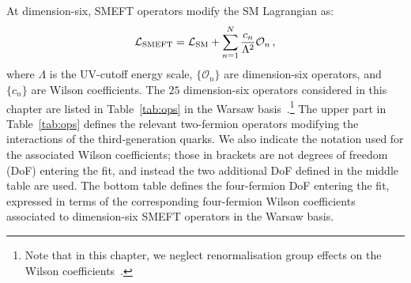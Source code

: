 \documentclass[withindex,glossary]{cam-thesis}
\begin{document}
At dimension-six, SMEFT operators modify the SM Lagrangian as:
\begin{equation}
    \label{eq:lagrangian}
    \mathcal{L}_{\rm SMEFT} = \mathcal{L}_{\rm SM} + \sum_{n=1}^{N} \frac{c_n}{\Lambda^2} \mathcal{O}_n \, ,
\end{equation}
%
where $\Lambda$ is the UV-cutoff energy scale, $\{\mathcal{O}_{n} \}$ are dimension-six operators, and
$\{ c_n \}$ are Wilson coefficients. The $25$ dimension-six operators considered in this chapter 
are listed in Table~\ref{tab:ops} in the Warsaw basis~\cite{Grzadkowski:2010es}.\footnote{Note that in this chapter, we neglect renormalisation group effects on the Wilson coefficients~\cite{Aoude:2022aro}. } 
The upper part in Table~\ref{tab:ops} defines the relevant two-fermion 
operators modifying the interactions of the third-generation
quarks.
%
We also indicate the notation used for the associated Wilson coefficients; those
in brackets are not degrees of freedom (DoF) entering the fit,
and instead the two additional DoF defined in the middle table are used.
%
The bottom table defines the four-fermion DoF entering the fit,
expressed in terms of the corresponding four-fermion Wilson coefficients
associated to dimension-six SMEFT operators in the Warsaw basis.
\end{document}
